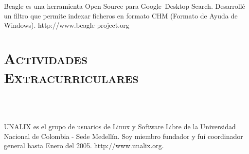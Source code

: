 \begin{resume}
\begin{position}
Beagle es una herramienta Open Source para Google\texttrademark  \  Desktop Search. Desarroll\'{e} un filtro que permite
indexar ficheros en formato CHM (Formato de Ayuda de Windows).
http://www.beagle-project.org
\end{position}

\section{\textsc{Actividades \\ Extracurriculares }}

\begin{formatb}
  \\
   
  \body\\
\end{formatb}

\begin{position}
UNALIX es el grupo de usuarios de Linux y Software Libre de la
Universidad Nacional de Colombia - Sede Medell\'{i}n. Soy miembro
fundador y fu\'{i} coordinador general hasta Enero del 2005. http://www.unalix.org.
\end{position}



\end{resume}
